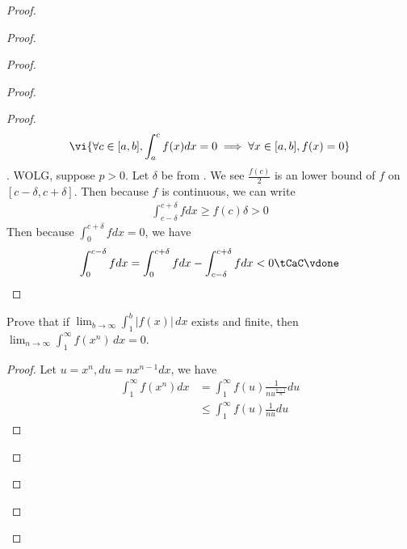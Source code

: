 \documentclass{report}
\begin{document}
\begin{proof}
\begin{proof}
\begin{proof}
\begin{proof}
\begin{proof}
\begin{align*}
\vi{\forall c\in [a,b],\int_a^c f(x)dx=0 \implies \forall x\in [a,b], f(x)=0}
\end{align*}
. WOLG, suppose  $p>0$. Let $\delta$ be from  . We see $\frac{f(c)}{2}$ is an lower bound of $f$ on  $[c-\delta,c+\delta]$. Then because $f$ is continuous, we can write 
\begin{align*}
\int_{c-\delta}^{c+\delta} fdx\geq f(c)\delta >0
\end{align*}
Then because $\int_0^{c+\delta}fdx=0$, we have 
\begin{align*}
\int_0^{c-\delta}fdx= \int_0^{c+\delta}fdx-\int_{c-\delta}^{c+\delta}fdx<0\tCaC \vdone
\end{align*}
\end{proof}
\begin{question}{}{}

Prove that if \(\lim_{b \to \infty} \int_{1}^{b} |f(x)| \, dx\) exists and finite, then \(\lim_{n \to \infty} \int_{1}^{\infty} f(x^n) \, dx = 0\).
\end{question}
\begin{proof}
Let $u=x^n,du=nx^{n-1}dx$, we have 
 \begin{align*}
\int_1^\infty f(x^n)dx&=\int_1^\infty  f(u)\frac{1}{nu^{\frac{n-1}{n}}}du\\
&\leq \int_1^\infty f(u)\frac{1}{nu}du 
\end{align*}
\end{proof}
\begin{question}{}{}


\end{question}
\end{proof}
\end{proof}
\end{proof}
\end{proof}
\end{document}
